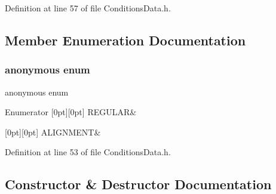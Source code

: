 Definition at line 57 of file Conditions\+Data.\+h.



\subsection{Member Enumeration Documentation}
\hypertarget{class_d_d4hep_1_1_conditions_1_1_abstract_map_a77a7651d9ea83e8c83ded9eb6765d532}{}\label{class_d_d4hep_1_1_conditions_1_1_abstract_map_a77a7651d9ea83e8c83ded9eb6765d532} 
\subsubsection{\texorpdfstring{anonymous enum}{anonymous enum}}
{\footnotesize\ttfamily anonymous enum}

\begin{DoxyEnumFields}{Enumerator}
[0pt][0pt]{}\hypertarget{class_d_d4hep_1_1_conditions_1_1_abstract_map_a77a7651d9ea83e8c83ded9eb6765d532a00ddc93e8ea953666d5b3560926184e7}{}\label{class_d_d4hep_1_1_conditions_1_1_abstract_map_a77a7651d9ea83e8c83ded9eb6765d532a00ddc93e8ea953666d5b3560926184e7} 
R\+E\+G\+U\+L\+AR&\\
\hline

[0pt][0pt]{}\hypertarget{class_d_d4hep_1_1_conditions_1_1_abstract_map_a77a7651d9ea83e8c83ded9eb6765d532a79b94c3c134968d52e05163d53c5b7cc}{}\label{class_d_d4hep_1_1_conditions_1_1_abstract_map_a77a7651d9ea83e8c83ded9eb6765d532a79b94c3c134968d52e05163d53c5b7cc} 
A\+L\+I\+G\+N\+M\+E\+NT&\\
\hline

\end{DoxyEnumFields}


Definition at line 53 of file Conditions\+Data.\+h.



\subsection{Constructor \& Destructor Documentation}
\hypertarget{class_d_d4hep_1_1_conditions_1_1_abstract_map_a8642c9a5024d3390bd2cb8e3c889073a}{}\label{class_d_d4hep_1_1_conditions_1_1_abstract_map_a8642c9a5024d3390bd2cb8e3c889073a} 
